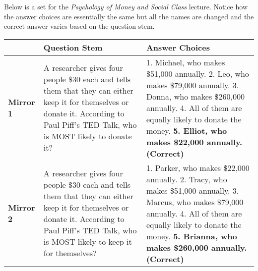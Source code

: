 \documentclass[
]{article}
\begin{document}
Below is a set for the \emph{Psychology of Money and Social Class} lecture. Notice how the answer choices are essentially the same but all the names are changed and the correct answer varies based on the question stem.

\begin{longtable}[]{@{}lll@{}}
\toprule
\begin{minipage}[b]{0.05\columnwidth}\raggedright
\strut
\end{minipage} & \begin{minipage}[b]{0.38\columnwidth}\raggedright
\textbf{Question Stem}\strut
\end{minipage} & \begin{minipage}[b]{0.48\columnwidth}\raggedright
\textbf{Answer Choices}\strut
\end{minipage}\tabularnewline
\midrule
\endhead
\begin{minipage}[t]{0.05\columnwidth}\raggedright
\textbf{Mirror 1}\strut
\end{minipage} & \begin{minipage}[t]{0.38\columnwidth}\raggedright
A researcher gives four people \$30 each and tells them that they can either keep it for themselves or donate it. According to Paul Piff's TED Talk, who is MOST likely to donate it?\strut
\end{minipage} & \begin{minipage}[t]{0.48\columnwidth}\raggedright
1. Michael, who makes \$51,000 annually. 2. Leo, who makes \$79,000 annually. 3. Donna, who makes \$260,000 annually. 4. All of them are equally likely to donate the money. \textbf{5. Elliot, who makes \$22,000 annually. (Correct)}\strut
\end{minipage}\tabularnewline
\begin{minipage}[t]{0.05\columnwidth}\raggedright
\textbf{Mirror 2}\strut
\end{minipage} & \begin{minipage}[t]{0.38\columnwidth}\raggedright
A researcher gives four people \$30 each and tells them that they can either keep it for themselves or donate it. According to Paul Piff's TED Talk, who is MOST likely to keep it for themselves?\strut
\end{minipage} & \begin{minipage}[t]{0.48\columnwidth}\raggedright
1. Parker, who makes \$22,000 annually. 2. Tracy, who makes \$51,000 annually. 3. Marcus, who makes \$79,000 annually. 4. All of them are equally likely to donate the money. \textbf{5. Brianna, who makes \$260,000 annually. (Correct)}\strut

\end{minipage}
\end{longtable}
\end{document}
